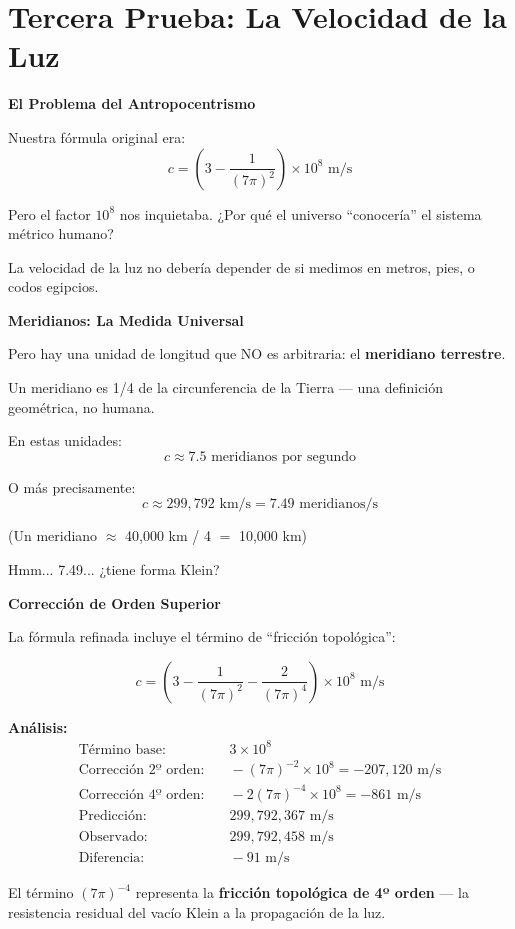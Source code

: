 \section{Tercera Prueba: La Velocidad de la Luz}

\begin{nivelconceptual}
\textbf{El Problema del Antropocentrismo}

Nuestra fórmula original era:
\[c = \left(3 - \frac{1}{(7\pi)^2}\right) \times 10^8 \text{ m/s}\]

Pero el factor $10^8$ nos inquietaba.
¿Por qué el universo ``conocería'' el sistema métrico humano?

La velocidad de la luz no debería depender de si medimos en metros,
pies, o codos egipcios.
\end{nivelconceptual}

\begin{analogiabox}
\textbf{Meridianos: La Medida Universal}

Pero hay una unidad de longitud que NO es arbitraria: el \textbf{meridiano terrestre}.

Un meridiano es 1/4 de la circunferencia de la Tierra --- una definición geométrica, no humana.

En estas unidades:
\[c \approx 7.5 \text{ meridianos por segundo}\]

O más precisamente:
\[c \approx 299,792 \text{ km/s} = 7.49 \text{ meridianos/s}\]

(Un meridiano $\approx$ 40,000 km / 4 $=$ 10,000 km)

Hmm... 7.49... ¿tiene forma Klein?
\end{analogiabox}

\begin{nivelmatematico}
\textbf{Corrección de Orden Superior}

La fórmula refinada incluye el término de ``fricción topológica'':

\begin{equation}
\boxed{c = \left(3 - \frac{1}{(7\pi)^2} - \frac{2}{(7\pi)^4}\right) \times 10^8 \text{ m/s}}
\end{equation}

\textbf{Análisis:}
\begin{align}
\text{Término base:} & \quad 3 \times 10^8\\
\text{Corrección 2º orden:} & \quad -(7\pi)^{-2} \times 10^8 = -207,120 \text{ m/s}\\
\text{Corrección 4º orden:} & \quad -2(7\pi)^{-4} \times 10^8 = -861 \text{ m/s}\\
\text{Predicción:} & \quad 299,792,367 \text{ m/s}\\
\text{Observado:} & \quad 299,792,458 \text{ m/s}\\
\text{Diferencia:} & \quad -91 \text{ m/s}
\end{align}

El término $(7\pi)^{-4}$ representa la \textbf{fricción topológica de 4º orden} ---
la resistencia residual del vacío Klein a la propagación de la luz.
\end{nivelmatematico}


